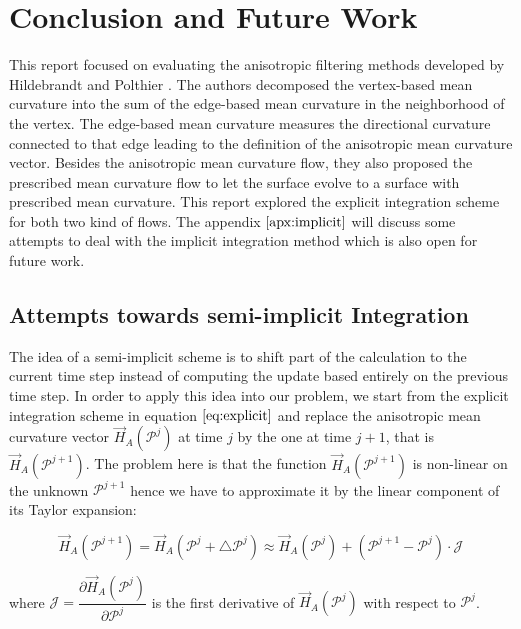 \documentclass[11pt]{article}
\begin{document}
\section{Conclusion and Future Work}

This report focused on evaluating the anisotropic filtering methods developed by Hildebrandt and Polthier \cite{Hildebrandt04anisotropicfiltering}. The authors decomposed the vertex-based mean curvature into the sum of the edge-based mean curvature in the neighborhood of the vertex. The edge-based mean curvature measures the directional curvature connected to that edge leading to the definition of the anisotropic mean curvature vector. Besides the anisotropic mean curvature flow, they also proposed the prescribed mean curvature flow to let the surface evolve to a surface with prescribed mean curvature. This report explored the explicit integration scheme for both two kind of flows. The appendix $\ref{apx:implicit}$ will discuss some attempts to deal with the implicit integration method which is also open for future work.




\begin{appendices}
\section{Attempts towards semi-implicit Integration}
\label{apx:implicit}

The idea of a semi-implicit scheme is to shift part of the calculation to the current time step instead of computing the update based entirely on the previous time step. In order to apply this idea into our problem, we start from the explicit integration scheme in equation $\ref{eq:explicit}$ and replace the anisotropic mean curvature vector $\vec{H}_A(\mathcal{P}^j)$ at time $j$ by the one at time $j+1$, that is $\vec{H}_A(\mathcal{P}^{j+1})$. The problem here is that the function $\vec{H}_A(\mathcal{P}^{j+1})$ is non-linear on the unknown $\mathcal{P}^{j+1}$ hence we have to approximate it by the linear component of its Taylor expansion:

\begin{equation}
\vec{H}_A(\mathcal{P}^{j+1}) = \vec{H}_A(\mathcal{P}^{j} + \bigtriangleup \mathcal{P}^j) \approx \vec{H}_A(\mathcal{P}^{j}) + (\mathcal{P}^{j+1} - \mathcal{P}^{j}) \cdot \mathcal{J}
\end{equation}

where $\mathcal{J} = \dfrac{\partial\vec{H}_A(\mathcal{P}^{j})}{\partial\mathcal{P}^{j}}$ is the first derivative of $\vec{H}_A(\mathcal{P}^{j})$ with respect to $\mathcal{P}^{j}$.

\end{appendices}
\end{document}
